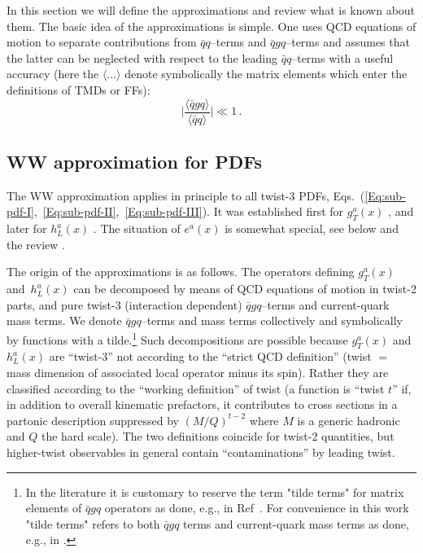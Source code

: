 \documentclass[a4paper,11pt]{article}
\newcommand{\be}{\begin{equation}}
\newcommand{\ee}{\end{equation}}
\newcommand{\la}{\langle}
\newcommand{\ra}{\rangle}
\begin{document}
In this section we will define the approximations and review what is
known about them.
The basic idea of the approximations is simple. One uses QCD
equations of motion to separate contributions from $\bar{q}q$--terms
and $\bar{q}gq$--terms and assumes that the latter can be neglected
with respect to the leading $\bar{q}q$--terms with a useful accuracy
(here the $\la\dots\ra$ denote symbolically the matrix elements
which enter the definitions of TMDs or FFs):
\be\label{Eq:WW-generic}
	\biggl|\frac{\la\bar{q}gq\ra}{\la\bar{q}q\ra}\biggr| \ll 1\,.
\ee

\subsection{WW approximation for PDF\lowercase{s}}
\label{Sec-3.1:WW-classic}

The WW approximation applies in principle to all twist-3 PDFs,
Eqs.~(\ref{Eq:sub-pdf-I},~\ref{Eq:sub-pdf-II},~\ref{Eq:sub-pdf-III}).
It was established first for $g_T^a(x)$ \cite{Wandzura:1977qf}, and
later for $h_L^a(x)$ \cite{Jaffe:1991ra}. The situation of $e^a(x)$
is somewhat special, see below and the review \cite{Efremov:2002qh}.

The origin of the approximations is as follows.
The operators defining $g_T^a(x)$ and~$h_L^a(x)$ can be decomposed by means
of QCD equations of motion in twist-2 parts, and pure twist-3
(interaction dependent) $\bar{q}gq$--terms and current-quark mass
terms. We denote $\bar{q}gq$--terms and mass terms collectively
and symbolically by functions with a tilde.\footnote{In the literature it is 
customary to reserve the term "tilde terms"
for matrix elements of $\bar{q}gq$ operators as done, e.g., in
Ref~\cite{Bacchetta:2006tn}. For convenience in this work "tilde terms"
refers to both $\bar{q}gq$ terms and current-quark mass terms as
done, e.g., in \cite{Metz:2008ib}.}  
Such decompositions are possible because $g_T^a(x)$ and $h_L^a(x)$ are
``twist-3'' not according to the ``strict QCD definition''
(twist $=$ mass dimension of associated local operator minus its spin).
Rather they are classified according to the ``working definition''
of twist \cite{Jaffe:1996zw}
(a function is ``twist $t$'' if, in addition to overall kinematic
prefactors, it contributes to cross sections in a partonic
description suppressed by $(M/Q)^{t-2}$ where $M$ is a generic
hadronic and $Q$ the hard scale).
The two definitions coincide for twist-2 quantities, but higher-twist
observables in general contain ``contaminations'' by leading twist.
\end{document}
